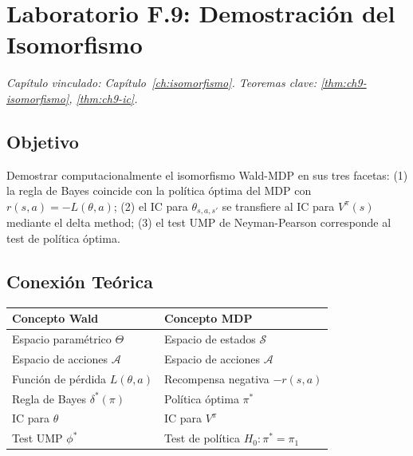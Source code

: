 \section{Laboratorio F.9: Demostración del Isomorfismo}
\label{lab:F9}
\textit{Capítulo vinculado: Capítulo~\ref{ch:isomorfismo}.
Teoremas clave: \ref{thm:ch9-isomorfismo}, \ref{thm:ch9-ic}.}

\bigskip

\subsection*{Objetivo}

Demostrar computacionalmente el isomorfismo Wald-MDP en sus tres facetas:
(1) la regla de Bayes coincide con la política óptima del MDP con
$r(s,a) = -L(\theta, a)$; (2) el IC para $\theta_{s,a,s'}$ se transfiere
al IC para $V^\pi(s)$ mediante el delta method; (3) el test UMP de
Neyman-Pearson corresponde al test de política óptima.

\subsection*{Conexión Teórica}

\begin{center}
\small
\begin{tabular}{ll}
\toprule
\textbf{Concepto Wald} & \textbf{Concepto MDP} \\
\midrule
Espacio paramétrico $\Theta$ & Espacio de estados $\mathcal{S}$ \\
Espacio de acciones $\mathcal{A}$ & Espacio de acciones $\mathcal{A}$ \\
Función de pérdida $L(\theta,a)$ & Recompensa negativa $-r(s,a)$ \\
Regla de Bayes $\delta^*(\pi)$ & Política óptima $\pi^*$ \\
IC para $\theta$ & IC para $V^\pi$ \\
Test UMP $\phi^*$ & Test de política $H_0:\pi^*=\pi_1$ \\
\bottomrule
\end{tabular}
\end{center}


